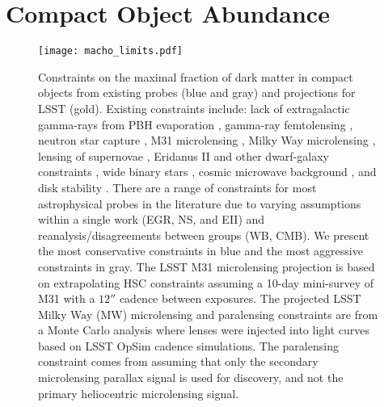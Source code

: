 \section{Compact Object Abundance }
\label{sec:compact_objects}


\begin{figure}[t]
\centering
\texttt{[image: macho\_limits.pdf]}
\caption{\label{fig:macho_constraints}
    Constraints on the maximal fraction of dark matter in compact objects from existing probes (blue and gray) and projections for LSST (gold).
    Existing constraints include: lack of extragalactic gamma-rays from PBH evaporation \citep[EGR;][]{0912.5297, 1604.05349}, gamma-ray femtolensing \citep[GF;][]{1204.2056}, neutron star capture \citep[NS][]{1301.4984}, M31 microlensing \citep[M31ML][]{1701.02151}, Milky Way microlensing \citep[MWML;][]{2007A&A...469..387T, 2001ApJ...550L.169A, 2009MNRAS.397.1228W}, lensing of supernovae \citep[LSN;][]{1712.02240,1712.06574}, Eridanus II and other dwarf-galaxy constraints \citep[EII;][]{2016ApJ...824L..31B, 1611.05052}, wide binary stars \citep[WB;][]{2009MNRAS.396L..11Q, 2004ApJ...601..311Y}, cosmic microwave background \citep[CMB;][]{2017PhRvD..95d3534A, 2008ApJ...680..829R}, and disk stability \citep[DS;][]{1985ApJ...299..633L, 1994ApJ...437..184X}.
    There are a range of constraints for most astrophysical probes in the literature due to varying assumptions within a single work (EGR, NS, and EII) and reanalysis/disagreements between groups (WB, CMB).
    We present the most conservative constraints in blue and the most aggressive constraints in gray.
    The LSST M31 microlensing projection is based on extrapolating HSC constraints \citep{1701.02151} assuming a 10-day mini-survey of M31 with a $12\second$ cadence between exposures.
    The projected LSST Milky Way (MW) microlensing and paralensing constraints are from a Monte Carlo analysis where lenses were injected into light curves based on LSST OpSim cadence simulations. 
    The paralensing constraint comes from assuming that only the secondary microlensing parallax signal is used for discovery, and not the primary heliocentric microlensing signal.
}
\end{figure}

